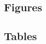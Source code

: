 
\subsection{Figures}

\begin{figure}[H]
\caption{}
\centering
\label{fig:}
\end{figure}


\newpage
\subsection{Tables}

\begin{table}[H]
\caption{}
\centering
\begin{threeparttable}
%
\end{threeparttable}
\label{tab:}
\end{table}
